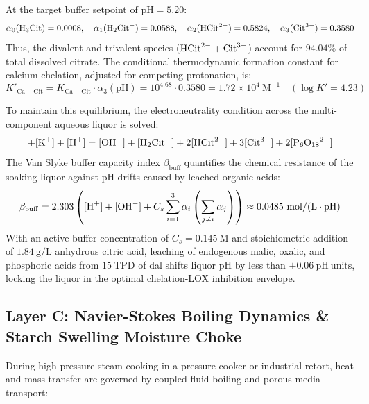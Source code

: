 \documentclass[10pt,a4paper]{article}
\begin{document}
At the target buffer setpoint of $\mathrm{pH } = 5.20$:
\begin{equation}
\alpha_0 (\ce{H3Cit}) = 0.0008, \quad \alpha_1 (\ce{H2Cit-}) = 0.0588, \quad \alpha_2 (\ce{HCit^{2-}}) = 0.5824, \quad \alpha_3 (\ce{Cit^{3-}}) = 0.3580
\end{equation}
Thus, the divalent and trivalent species ($\ce{HCit^{2-}} + \ce{Cit^{3-}}$) account for \textbf{$94.04\%$} of total dissolved citrate. The conditional thermodynamic formation constant for calcium chelation, adjusted for competing protonation, is:
\begin{equation}
K'_{\mathrm{Ca-Cit}} = K_{\mathrm{Ca-Cit}} \cdot \alpha_3(\text{pH}) = 10^{4.68} \cdot 0.3580 = 1.72 \times 10^4\ \mathrm{M^{-1}} \quad (\log K' = 4.23)
\end{equation}

To maintain this equilibrium, the electroneutrality condition across the multi-component aqueous liquor is solved:
\begin{equation}
[\ce{Na+}] + [\ce{K+}] + [\ce{H+}] = [\ce{OH-}] + [\ce{H2Cit-}] + 2[\ce{HCit^{2-}}] + 3[\ce{Cit^{3-}}] + 2[\ce{P6O18^{2-}}]
\end{equation}
The Van Slyke buffer capacity index $\beta_{\mathrm{buff}}$ quantifies the chemical resistance of the soaking liquor against pH drifts caused by leached organic acids:
\begin{equation}
\beta_{\mathrm{buff}} = 2.303 \left( [\ce{H+}] + [\ce{OH-}] + C_s \sum_{i=1}^3 \alpha_i \left( \sum_{j \ne i} \alpha_j \right) \right) \approx 0.0485\ \mathrm{mol/(L \cdot pH)}
\end{equation}
With an active buffer concentration of $C_s = 0.145\ \mathrm{M}$ and stoichiometric addition of $1.84\ \mathrm{g/L}$ anhydrous citric acid, leaching of endogenous malic, oxalic, and phosphoric acids from $15\ \mathrm{TPD}$ of dal shifts liquor pH by less than $\pm 0.06\ \mathrm{pH\ units}$, locking the liquor in the optimal chelation-LOX inhibition envelope.

\subsection{Layer C: Navier-Stokes Boiling Dynamics \& Starch Swelling Moisture Choke}
During high-pressure steam cooking in a pressure cooker or industrial retort, heat and mass transfer are governed by coupled fluid boiling and porous media transport:
\end{document}
